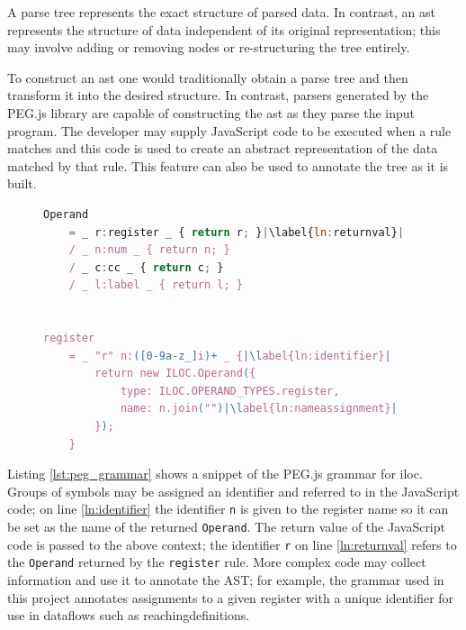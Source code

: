 \documentclass[bsc,twoside,singlespacing,parskip,logo,notimes,normalheadings]{infthesis}
\begin{document}
        A parse tree represents the exact structure of parsed data. In
        contrast, an \gls{ast} represents the structure of data
        independent of its original representation; this may involve
        adding or removing nodes or re-structuring the tree entirely.

        To construct an \gls{ast} one would traditionally obtain a
        parse tree and then transform it into the desired
        structure. In contrast, parsers generated by the PEG.js
        library are capable of constructing the \gls{ast} as they
        parse the input program. The developer may supply JavaScript
        code to be executed when a rule matches and this code is used
        to create an abstract representation of the data matched by
        that rule. This feature can also be used to annotate the tree
        as it is built.

        \begin{figure}[!ht]
          \begin{lstlisting}[language=JavaScript, caption=Example of PEG.js Grammar Rules, escapeinside={||}, label=lst:peg_grammar]
Operand
    = _ r:register _ { return r; }|\label{ln:returnval}|
    / _ n:num _ { return n; }      
    / _ c:cc _ { return c; }       
    / _ l:label _ { return l; }    
                                   

register
    = _ "r" n:([0-9a-z_]i)+ _ {|\label{ln:identifier}|
        return new ILOC.Operand({
            type: ILOC.OPERAND_TYPES.register,
            name: n.join("")|\label{ln:nameassignment}|
        });
    }
          \end{lstlisting}
        \end{figure}

        Listing \ref{lst:peg_grammar} shows a snippet of the PEG.js
        grammar for \gls{iloc}. Groups of symbols may be assigned an
        identifier and referred to in the JavaScript code; on line
        \ref{ln:identifier} the identifier {\tt n} is given to the
        register name so it can be set as the name of the returned
        {\tt Operand}. The return value of the JavaScript code is
        passed to the above context; the identifier {\tt r} on line
        \ref{ln:returnval} refers to the {\tt Operand} returned by the
        {\tt register} rule. More complex code may collect information
        and use it to annotate the AST; for example, the grammar used
        in this project annotates assignments to a given register with
        a unique identifier for use in \gls{dataflow}s such as
        \gls{reachingdefinition}s.
\end{document}
